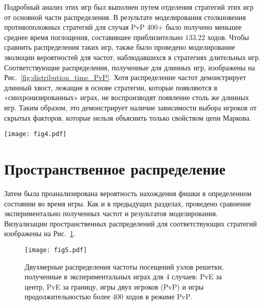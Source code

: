 Подробный анализ этих игр был выполнен путем отделения стратегий этих игр от основной части распределения. 
В результате моделирования столкновения противоположных стратегий для случая PvP 400+ было получено меньшее среднее время поглощения, составившее приблизительно $133.22$ ходов. 
Чтобы сравнить распределения таких игр, также было проведено моделирование эволюции вероятностей для частот, наблюдавшихся в стратегиях длительных игр. 
Соответствующие распределения, полученные для длинных игр, изображены на Рис.~\cref{fig:distribution_time_PvP}. Хотя распределение частот демонстрирует длинный хвост, 
лежащие в основе стратегии, которые появляются в «синхронизированных» играх, не воспроизводят появление столь же длинных игр. 
Таким образом, это демонстрирует наличие зависимости выбора игроков от скрытых факторов, которые нельзя объяснить только свойством цепи Маркова.


\begin{figure*}[t]
    \begin{center}
    \texttt{[image: fig4.pdf]}
    \caption{
        Распределение времени поглощения для режима PvP (желтая гистограмма и фиолетовая линия) 
        по сравнению с моделированием частот направлений движения (зеленая линия) и частот стратегий (синяя линия), 
        наблюдаемых в длительных играх (более 400 ходов). Частоты направлений движения для каждого состояния, полученные в 
        экспериментальных длинных играх, использовались для моделирования эволюции вероятностей найти фишку в узлах решетки. 
        Стратегии обоих игроков A и B в PvP с длиной ходов более 400 использовались отдельно при моделировании.
    }  
    \label{fig:distribution_time_PvP}
    \end{center}
\end{figure*}


\section{Пространственное распределение}\label{sec:ch3/sec4}

Затем была проанализирована вероятность нахождения фишки в определенном состоянии во время игры. 
Как и в предыдущих разделах, проведено сравнение экспериментально полученных частот и результатов моделирования. 
Визуализации пространственных распределений для соответствующих стратегий изображены на Рис.~\cref{fig:distribution_states}.

\begin{figure}[t]
    \begin{center}
    \texttt{[image: fig5.pdf]}
    \caption{
        Двухмерные распределения частоты посещений узлов решетки, полученные в экспериментальных играх для 4 случаев: 
        PvE за центр, PvE за границу, игры двух игроков (PvP) и игры продолжительностью более 400 ходов в режиме PvP.
    }  
    \label{fig:distribution_states}
    \end{center}
\end{figure}

